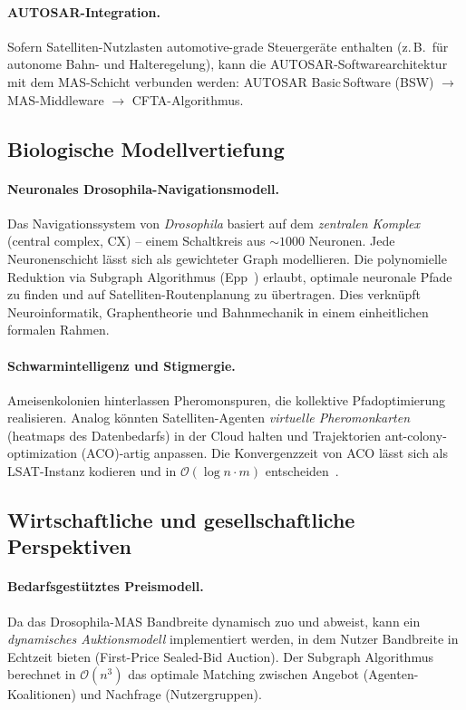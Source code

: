 ﻿\documentclass[a4paper,12pt]{article}
\theoremstyle{definition}
\begin{document}
\paragraph{AUTOSAR-Integration.}
Sofern Satelliten-Nutzlasten automotive-grade Steuerger\"ate enthalten
(z.\,B.\ f\"ur autonome Bahn- und Halteregelung),
kann die AUTOSAR-Softwarearchitektur~\cite{AUTOSAR} mit dem MAS-Schicht
verbunden werden: AUTOSAR Basic\,Soft\-ware (BSW) $\to$ MAS-Middleware $\to$ CFTA-Algorithmus.

\subsection{Biologische Modellvertiefung}

\paragraph{Neuronales Drosophila-Navigationsmodell.}
Das Navigationssystem von \emph{Drosophila} basiert auf dem \emph{zentralen Komplex}
(central complex, CX) -- einem Schaltkreis aus $\sim1000$ Neuronen.
Jede Neuronenschicht l\"asst sich als gewichteter Graph modellieren.
Die polynomielle Reduktion via Subgraph Algorithmus (Epp~\cite{Epp2026})
erlaubt, optimale neuronale Pfade zu finden und auf Satelliten-Routenplanung
zu \"ubertragen. Dies verkn\"upft Neuroinformatik, Graphentheorie und
Bahnmechanik in einem einheitlichen formalen Rahmen.

\paragraph{Schwarmintelligenz und Stigmergie.}
Ameisenkolonien hinterlassen Pheromonspuren, die kollektive Pfadoptimierung
realisieren. Analog k\"onnten Satelliten-Agenten \emph{virtuelle Pheromonkarten}
(heatmaps des Datenbedarfs) in der Cloud halten und Trajektorien
ant-colony-optimization (ACO)-artig anpassen.
Die Konvergenzzeit von ACO l\"asst sich als LSAT-Instanz kodieren
und in $\mathcal{O}(\log n \cdot m)$ entscheiden~\cite{Epp2026lsat}.

\subsection{Wirtschaftliche und gesellschaftliche Perspektiven}

\paragraph{Bedarfsgest\"utztes Preismodell.}
Da das Drosophila-MAS Bandbreite dynamisch zuo und abweist,
kann ein \emph{dynamisches Auktionsmodell} implementiert werden,
in dem Nutzer Bandbreite in Echtzeit bieten (First-Price Sealed-Bid Auction).
Der Subgraph Algorithmus berechnet in $\mathcal{O}(n^3)$ das optimale Matching
zwischen Angebot (Agenten-Koalitionen) und Nachfrage (Nutzergruppen).
\end{document}
